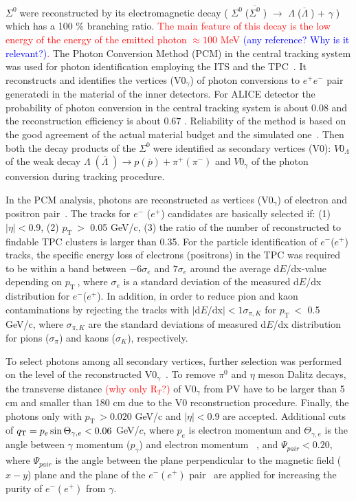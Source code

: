 \documentclass[ALICE,manyauthors]{cernphprep}
\newcommand{\sig}{\ensuremath{\Sigma^0  \; }}
\newcommand{\asig}{\ensuremath{\overline{\Sigma^0} \; }}
\newcommand{\gam}{\ensuremath{\gamma \; }}
\newcommand{\lam}{\ensuremath{\Lambda \; }}
\newcommand{\alam}{\ensuremath{\overline{\Lambda} \; }}
\newcommand{\pt}{\ensuremath{p_{\mathrm{T}\; }}}
\newcommand{\red}{\textcolor{red}}
\newcommand{\blue}{\textcolor{blue}}
\begin{document}
\sig  were reconstructed by its electromagnetic decay 
( \sig (\asig) $\to $ \lam (\alam) + \gam \;) which has a 100 \% branching ratio.  
\red{The main feature of this decay is the low energy of the energy of the emitted photon
$\approx 100$ MeV \blue{(any reference? Why is it relevant?)}.}
The Photon Conversion Method (PCM) in the central tracking system was used for photon identification 
employing the ITS and the TPC~\cite{cite:ALICEPerformance,cite:ALICE-DirPhot2016,cite:pi0-2012}.
It  reconstructs and identifies  the vertices (V0$_{\gamma}$) of photon conversions to $e^+ e^-$ pair generatedi in the
material of the inner detectors. For ALICE detector the  probability of photon conversion in the central tracking system is about 0.08 and the 
reconstruction efficiency  is about $0.67$ \cite{cite:pi0-2012}. Reliability of the method is based on the 
good agreement of the actual material budget and the simulated one~\cite{cite:ALICEPerformance}. 
Then both the decay products of the \sig were identified as secondary vertices (V0): $V0_{\Lambda}$ of 
the weak decay   $ \lam (\alam) \to p (\bar p) + \pi^+ (\pi^-)$ and $V0_{\gamma}$ of the photon conversion
during tracking procedure.

In the PCM analysis,  photons are reconstructed as vertices (V0$_{\gamma}$) of  electron and positron 
pair~\cite{cite:pi0-2012,cite:ALICE2014-pi0-pp-pPb-2.76TeV,cite:ALICE-DirPhot2016,cite:ALICE-pi0eta-2018}.
The tracks for $e^-$ ($e^+$) candidates are basically selected if: (1) $|\eta| <0.9$, (2) \pt $>$ 0.05 GeV/c, 
(3) the ratio of the number of reconstructed to findable TPC  clusters is larger than 0.35.
For the particle identification of $e^-$($e^+$) tracks, the specific energy loss of electrons (positrons) in the TPC
was required to be within a band between $-6\sigma_{e}$ and $7\sigma_{e}$ around the
average d$E$/dx-value depending on \pt, where $\sigma_{e}$ is a standard deviation
of the measured d$E$/dx distribution for $e^-$($e^+$).
In addition,  in order to reduce pion and kaon contaminations by rejecting the tracks with $|$d$E$/dx$|<1\sigma_{\pi, K}$ 
for \pt $<$ 0.5 GeV/c, where $\sigma_{\pi, K}$ are the standard deviations of measured d$E$/dx 
distribution for pions ($\sigma_{\pi}$) and kaons ($\sigma_{K}$), respectively. 

To select photons among all secondary vertices, further selection was performed on the level of the 
reconstructed  V0$_{\gamma}$~\cite{cite:ALICE-DirPhot2016,cite:pi0-2012}. 
To remove $\pi^0$ and $\eta$ meson Dalitz decays, the transverse distance \red{(why only R$_T$?)} 
of V0$_{\gamma}$ from PV have to be larger than 5 cm and smaller than 180 cm due to the V0 reconstruction 
procedure. Finally, the photons only with \pt $> 0.020$ GeV/c and $|\eta| <0.9$ are accepted.
Additional cuts of $q_{\rm{T}} = p_e \sin{\Theta_{\gamma,e}}<0.06$ GeV/$c$, where $p_e$ is electron momentum and
$\Theta_{\gamma,e}$ is the angle between  $\gamma$ momentum ($p_\gamma$) and electron momentum
~\cite{cite:ArPod}, and $\Psi_{pair} < 0.20$, where $\Psi_{pair}$ is the angle between the plane perpendicular to 
the magnetic field ($x-y$) plane and the plane of the $e^-(e^+)$ pair~\cite{cite:ALICE-pi0eta-2018}
are applied for increasing the purity of $e^-(e^+)$ from $\gamma$.
\end{document}
